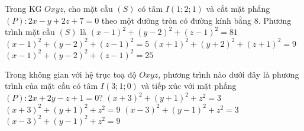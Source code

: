 \begin{ex}%
	Trong KG $Oxyz$, cho mặt cầu $\left( S \right)$ có tâm $I\left( 1;2;1 \right)$ và cắt mặt phẳng $\left( P \right)\colon2x-y+2z+7=0$ theo một đường tròn có đường kính bằng $8$. Phương trình mặt cầu $\left( S \right)$ là
	\choice
	{$\left( x-1 \right)^2+\left( y-2 \right)^2+\left( z-1 \right)^2=81$}
	{${{\left( x-1 \right)}^2}+{{\left( y-2 \right)}^2}+{{\left( z-1 \right)}^2}=5$}
	{${{\left( x+1 \right)}^2}+{{\left( y+2 \right)}^2}+{{\left( z+1 \right)}^2}=9$}
	{\True ${{\left( x-1 \right)}^2}+{{\left( y-2 \right)}^2}+{{\left( z-1 \right)}^2}=25$}
\end{ex}

\begin{ex}%
	Trong không gian với hệ trục toạ độ $Oxyz$, phương trình nào dưới đây là phương trình của mặt cầu có tâm $I\left( 3;1;0 \right)$ và tiếp xúc với mặt phẳng $\left( P \right): 2x + 2y - z + 1=0$?
	\choice
	{${{\left( x+3 \right)}^2}+{{\left( y+1 \right)}^2}+z^2=3$}
	{${{\left( x+3 \right)}^2}+{{\left( y+1 \right)}^2}+z^2=9$}
	{${{\left( x-3 \right)}^2}+{{\left( y-1 \right)}^2}+z^2=3$}
	{\True ${{\left( x-3 \right)}^2}+{{\left( y-1 \right)}^2}+z^2=9$}
\end{ex}


